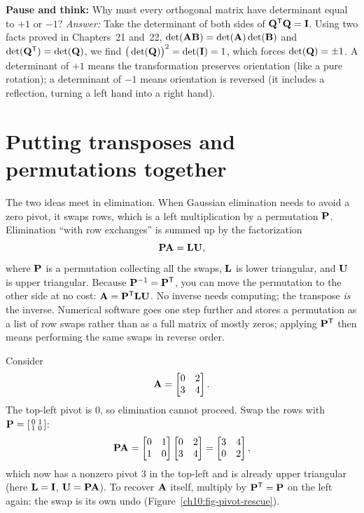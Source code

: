 \begin{recoverybox}
\textbf{Pause and think:} Why must every orthogonal matrix have determinant equal to $+1$ or $-1$?
\emph{Answer:} Take the determinant of both sides of $\mathbf{Q}^{\mathsf{T}}\mathbf{Q}=\mathbf{I}$.
Using two facts proved in Chapters~21 and~22, $\det(\mathbf{A}\mathbf{B})=\det(\mathbf{A})\det(\mathbf{B})$ and
$\det(\mathbf{Q}^{\mathsf{T}})=\det(\mathbf{Q})$, we find $\big(\det(\mathbf{Q})\big)^2 = \det(\mathbf{I}) = 1$, which
forces $\det(\mathbf{Q}) = \pm 1$.
A determinant of $+1$ means the transformation preserves orientation (like a pure rotation);
a determinant of $-1$ means orientation is reversed (it includes a reflection, turning a left hand
into a right hand).
\end{recoverybox}

\section{Putting transposes and permutations together}

The two ideas meet in elimination.
When Gaussian elimination needs to avoid a zero pivot, it swaps rows, which is a left multiplication
by a permutation $\mathbf{P}$. Elimination ``with row exchanges'' is summed up by the
factorization
\[
  \mathbf{P}\mathbf{A} = \mathbf{L}\mathbf{U},
\]
where $\mathbf{P}$ is a permutation collecting all the swaps, $\mathbf{L}$ is lower triangular, and
$\mathbf{U}$ is upper triangular. Because $\mathbf{P}^{-1}=\mathbf{P}^{\mathsf{T}}$, you can move the permutation to the
other side at no cost: $\mathbf{A}=\mathbf{P}^{\mathsf{T}}\mathbf{L}\mathbf{U}$. No inverse needs computing; the transpose
\emph{is} the inverse. Numerical software goes one step further and stores a permutation as a list
of row swaps rather than as a full matrix of mostly zeros; applying $\mathbf{P}^{\mathsf{T}}$ then means
performing the same swaps in reverse order.

\begin{example}\label{ch10:ex-pivot}
Consider
\[
  \mathbf{A}=\begin{bmatrix} 0 & 2 \\ 3 & 4 \end{bmatrix}.
\]
The top-left pivot is $0$, so elimination cannot proceed. Swap the rows with
$\mathbf{P}=\left[\begin{smallmatrix}0&1\\1&0\end{smallmatrix}\right]$:
\[
  \mathbf{P}\mathbf{A}
  = \begin{bmatrix} 0&1\\1&0 \end{bmatrix}\begin{bmatrix} 0 & 2 \\ 3 & 4 \end{bmatrix}
  = \begin{bmatrix} 3 & 4 \\ 0 & 2 \end{bmatrix},
\]
which now has a nonzero pivot $3$ in the top-left and is already upper triangular (here $\mathbf{L}=\mathbf{I}$,
$\mathbf{U}=\mathbf{P}\mathbf{A}$). To recover $\mathbf{A}$ itself, multiply by $\mathbf{P}^{\mathsf{T}}=\mathbf{P}$ on the left
again: the swap is its own undo (Figure~\ref{ch10:fig-pivot-rescue}).
\end{example}


